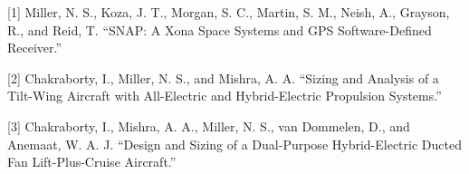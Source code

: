 [1]  Miller, N. S., Koza, J. T., Morgan, S. C., Martin, S. M., Neish, A., Grayson, R., and Reid, T. “SNAP: A Xona Space Systems and GPS Software-Defined Receiver.”

[2]  Chakraborty, I., Miller, N. S., and Mishra, A. A. “Sizing and Analysis of a Tilt-Wing Aircraft with All-Electric and Hybrid-Electric Propulsion Systems.”

[3]  Chakraborty, I., Mishra, A. A., Miller, N. S., van Dommelen, D., and Anemaat, W. A. J. “Design and Sizing of a Dual-Purpose Hybrid-Electric Ducted Fan Lift-Plus-Cruise Aircraft.”


